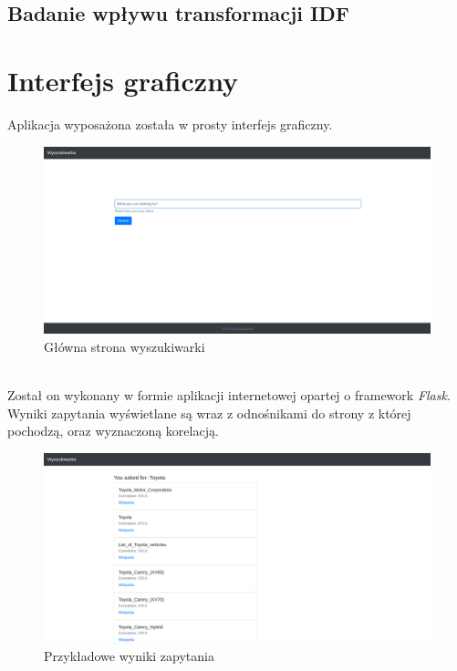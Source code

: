 \documentclass{article}
\begin{document}
        
        \subsection{Badanie wpływu transformacji IDF}
            
            
    \section{Interfejs graficzny}
        Aplikacja wyposażona została w prosty interfejs graficzny.
        \begin{figure}[h!]
            \centering
            \includegraphics[width=14cm]{lab6/img/front_index.png}
            \caption{Główna strona wyszukiwarki}
        \end{figure}\\
        Został on wykonany w formie aplikacji internetowej opartej o framework \textit{Flask}. \\
        Wyniki zapytania wyświetlane są wraz z odnośnikami do strony z której pochodzą, oraz wyznaczoną korelacją. 
        \begin{figure}[h!]
            \centering
            \includegraphics[width=14cm]{lab6/img/front_result1.png}
            \caption{Przykładowe wyniki zapytania}
        \end{figure}\\
\end{document}
